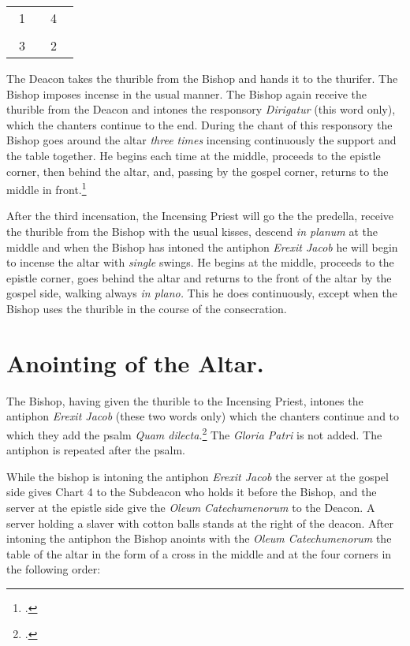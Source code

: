 \documentclass[letterpaper]{report}
\newcommand\crossplan{
\begin{center}
    \begin{tabular}{ | l c r | }
       \hline
        \cross\ {\tiny 1} &         & {\tiny 4} \cross\ \\
                           & \cross &           \\
        \cross\ {\tiny 3} &         & {\tiny 2} \cross\ \\
       \hline
   \end{tabular} 
\end{center}
}
\begin{document}
{\crossplan

\rubric The Deacon takes the thurible from the Bishop and hands it to the
thurifer. The Bishop imposes incense in the usual manner. The Bishop again
receive the thurible from the Deacon and intones the responsory
\textit{Dirigatur} (this word only), which the chanters continue to the end.
During the chant of this responsory the Bishop goes around the altar
\textit{three times} incensing continuously the support and the table together.
He begins each time at the middle, proceeds to the epistle corner, then behind
the altar, and, passing by the gospel corner, returns to the middle in
front.\footcite[If the back of the altar is attached to the wall, he begins at
the middle, incenses the support as fas as the epistle corner, afterwards the
table from the epistle to the gospel side, then the side of the altar at the
gospel side, then the side of the altar at the gospel corner and finally the
support from the gospel corner to the middle.][footnote 1, p. 96.]{consecranda}

\rubric After the third incensation, the Incensing Priest will go the the
predella, receive the thurible from the Bishop with the usual kisses, descend
\textit{in planum} at the middle and when the Bishop has intoned the antiphon
\textit{Erexit Jacob} he will begin to incense the altar with \textit{single}
swings. He begins at the middle, proceeds to the epistle corner, goes behind
the altar and returns to the front of the altar by the gospel side, walking
always \textit{in plano.} This he does continuously, except when the Bishop
uses the thurible in the course of the consecration.

\section{Anointing of the Altar.}

\rubric The Bishop, having given the thurible to the Incensing Priest, intones
the antiphon \textit{Erexit Jacob} (these two words only) which the chanters
continue and to which they add the psalm \textit{Quam dilecta.}\footcite[The
rubric appplied to psalm 42 above applied here as well.]{consecranda} The
\textit{Gloria Patri} is not added. The antiphon is repeated after the psalm.

\rubric While the bishop is intoning the antiphon \textit{Erexit Jacob} the
server at the gospel side gives Chart 4 to the Subdeacon who holds it before
the Bishop, and the server at the epistle side give the \textit{Oleum
Catechumenorum} to the Deacon. A server holding a slaver with cotton balls
stands at the right of the deacon. After intoning the antiphon the Bishop
anoints with the \textit{Oleum Catechumenorum} the table of the altar in the
form of a cross in the middle and at the four corners in the following order:

}
\end{document}
